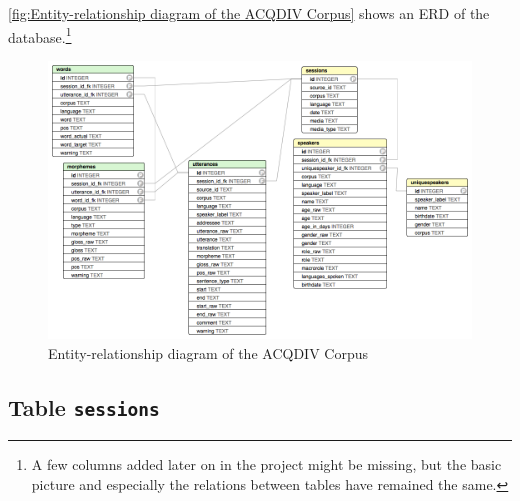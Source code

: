 \documentclass[a4paper, 11pt]{book}
\begin{document}
\autoref{fig:Entity-relationship diagram of the ACQDIV Corpus} shows an ERD of the database.\footnote{A few columns added later on in the project might be missing, but the basic picture and especially the relations between tables have remained the same.}

\begin{landscape}
\begin{figure}
	\centering
	\includegraphics[scale=0.6]{pics/ERD.png}
	\caption{Entity-relationship diagram of the ACQDIV Corpus}
	\label{fig:Entity-relationship diagram of the ACQDIV Corpus}
\end{figure}
\end{landscape}

\subsection{Table \texttt{sessions}}
\label{subsec:Table sessions}
\end{document}
